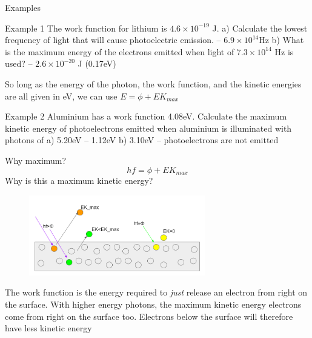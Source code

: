 \documentclass[../Main.tex]{subfiles}
\begin{document}
\begin{frame}{Examples}
    \begin{exampleblock}{Example 1}
    The work function for lithium is $4.6 \times 10^{-19}$ J. \newline
a) Calculate the lowest frequency of light that will cause photoelectric emission. \pause 
-- $6.9\times10^{14}$Hz \newline 
b) What is the maximum energy of the electrons emitted when light of $7.3\times 10^{14}$ Hz is used? \pause
-- $2.6\times10^{-20}$ J (0.17eV)
    \end{exampleblock} 
    So long as the energy of the photon, the work function, and the kinetic energies are all given in eV, we can use $E=\phi+EK_{max}$
    
    \begin{exampleblock}{Example 2}
    Aluminium has a work function 4.08eV. Calculate the maximum kinetic energy of photoelectrons emitted when aluminium is illuminated with photons of \newline a) 5.20eV \pause 
    -- 1.12eV
    \newline b) 3.10eV \pause 
    -- photoelectrons are not emitted
    \end{exampleblock}
\end{frame}

\begin{frame}{Why maximum?}
    \begin{equation*}
        hf = \phi + EK_{max}
    \end{equation*} 
    Why is this a maximum kinetic energy? \pause
    \begin{figure}
        \centering
        \includegraphics[height=3.5cm]{Quantum_Images/maxkineticenergy.png}
    \end{figure}
    The work function is the energy required to \emph{just} release an electron from right on the surface. With higher energy photons, the maximum kinetic energy electrons come from right on the surface too. Electrons below the surface will therefore have less kinetic energy
\end{frame}
\end{document}
